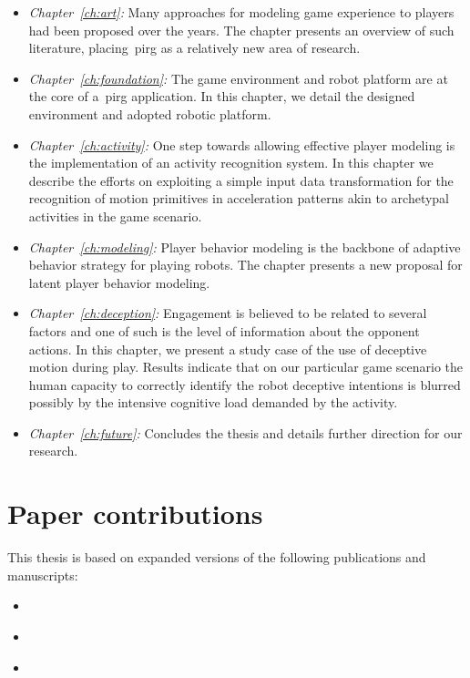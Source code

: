 \begin{itemize}
\item\emph{Chapter~\ref{ch:art}:} Many approaches for modeling %
game experience to players had been proposed over the years. The chapter presents an overview of such literature, placing~\gls{pirg} as a relatively new area of research.
\item\emph{Chapter~\ref{ch:foundation}:} The game environment and robot platform are at the core of a~\gls{pirg} application. In this chapter, we detail the designed environment and adopted robotic platform.
\item\emph{Chapter~\ref{ch:activity}:} One step towards allowing effective player modeling is the implementation of an activity recognition system. In this chapter we describe the efforts on exploiting a simple input data transformation for the recognition of motion primitives in acceleration patterns akin to archetypal activities in the game scenario.
\item\emph{Chapter~\ref{ch:modeling}:} Player behavior modeling is the backbone of adaptive behavior strategy for playing robots. The chapter presents a new proposal for latent player behavior modeling.
\item\emph{Chapter~\ref{ch:deception}:} Engagement is believed to be related to several factors and one of such is the level of information about the opponent actions. In this chapter, we present a study case of the use of deceptive motion during play. Results indicate that on our particular game scenario the human capacity to correctly identify the robot deceptive intentions is blurred possibly by the intensive cognitive load demanded by the activity.
\item\emph{Chapter~\ref{ch:future}:} Concludes the thesis and details further direction for our research.
\end{itemize}

\section{Paper contributions}
This thesis is based on expanded versions of the following publications and manuscripts:
\begin{itemize}
\item \cite{oliveira_learning_2018}
\item \cite{oliveira_modeling_2017}
\item \cite{oliveira_activity_2017}
\end{itemize}
